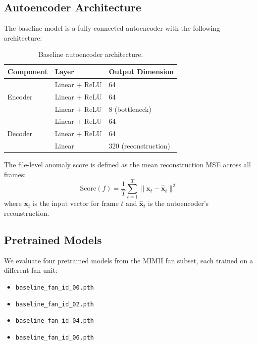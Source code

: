 \documentclass[12pt, a4paper]{article}
\begin{document}
\subsection{Autoencoder Architecture}
\label{sec:single-model-eval}

The baseline model is a fully-connected autoencoder with the following architecture:

\begin{table}[htbp]
\centering
\caption{Baseline autoencoder architecture.}
\label{tab:architecture}
\begin{tabular}{lll}
\toprule
Component & Layer & Output Dimension \\
\midrule
\multirow{3}{*}{Encoder} & Linear + ReLU & 64 \\
                          & Linear + ReLU & 64 \\
                          & Linear + ReLU & 8 (bottleneck) \\
\midrule
\multirow{3}{*}{Decoder} & Linear + ReLU & 64 \\
                          & Linear + ReLU & 64 \\
                          & Linear        & 320 (reconstruction) \\
\bottomrule
\end{tabular}
\end{table}

The file-level anomaly score is defined as the mean reconstruction MSE across all frames:
\begin{equation}
    \text{Score}(f) = \frac{1}{T} \sum_{t=1}^{T} \| \mathbf{x}_t - \hat{\mathbf{x}}_t \|^2
\end{equation}
where $\mathbf{x}_t$ is the input vector for frame $t$ and $\hat{\mathbf{x}}_t$ is the autoencoder's reconstruction.

\subsection{Pretrained Models}

We evaluate four pretrained models from the MIMII fan subset, each trained on a different fan unit:
\begin{itemize}
    \item \texttt{baseline\_fan\_id\_00.pth}
    \item \texttt{baseline\_fan\_id\_02.pth}
    \item \texttt{baseline\_fan\_id\_04.pth}
    \item \texttt{baseline\_fan\_id\_06.pth}
\end{itemize}
\end{document}

